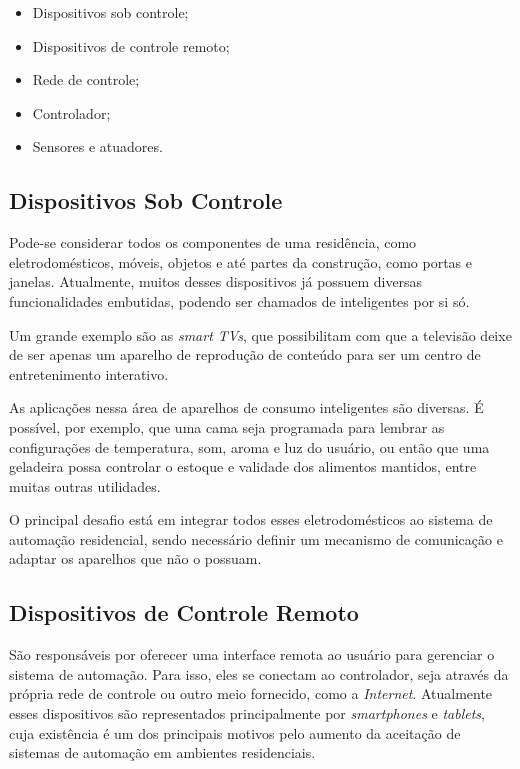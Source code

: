 \begin{itemize}
	\item Dispositivos sob controle;
	\item Dispositivos de controle remoto;
	\item Rede de controle;
	\item Controlador;
	\item Sensores e atuadores.
\end{itemize}

\subsection{Dispositivos Sob Controle}
Pode-se considerar todos os componentes de uma residência, como eletrodomésticos, móveis, objetos e até partes
da construção, como portas e janelas. Atualmente, muitos desses dispositivos já possuem diversas
funcionalidades embutidas, podendo ser chamados de inteligentes por si só.

Um grande exemplo são as \textit{smart TVs}, que possibilitam com que a televisão deixe de ser apenas um
aparelho de reprodução de conteúdo para ser um centro de entretenimento interativo.

As aplicações nessa área de aparelhos de consumo inteligentes são diversas. É possível, por exemplo, que uma
cama seja programada para lembrar as configurações de temperatura, som, aroma e luz do usuário, ou então que
uma geladeira possa controlar o estoque e validade dos alimentos mantidos, entre muitas outras utilidades.
\cite{jiang_liu_yang2004}

O principal desafio está em integrar todos esses eletrodomésticos ao sistema de automação residencial, sendo
necessário definir um mecanismo de comunicação e adaptar os aparelhos que não o possuam.

\subsection{Dispositivos de Controle Remoto}
São responsáveis por oferecer uma interface remota ao usuário para gerenciar o sistema de automação. Para
isso, eles se conectam ao controlador, seja através da própria rede de controle ou outro meio fornecido, como
a \textit{Internet}. Atualmente esses dispositivos são representados principalmente por \textit{smartphones} e
\textit{tablets}, cuja existência é um dos principais motivos pelo aumento da aceitação de sistemas de
automação em ambientes residenciais. \cite{kyas2013}

